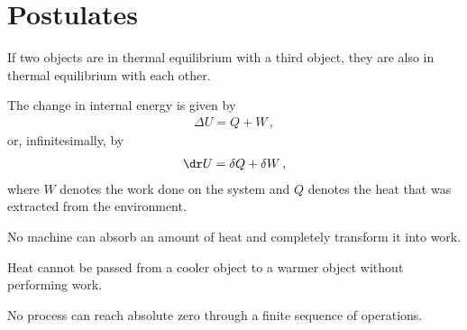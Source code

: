 \section{Postulates}

    \begin{axiom}
        If two objects are in thermal equilibrium with a third object, they are also in thermal equilibrium with each other.
    \end{axiom}
    \begin{axiom}
        The change in internal energy is given by
        \begin{gather}
            \label{thermo:first_law}
            \Delta U = Q + W\,,
        \end{gather}
        or, infinitesimally, by
        \begin{gather}
            \label{thermo:first_law_differential}
            \dr U = \delta Q + \delta W\,,
        \end{gather}
        where $W$ denotes the work done on the system and $Q$ denotes the heat that was extracted from the environment.
    \end{axiom}

    \begin{axiom}
        No machine can absorb an amount of heat and completely transform it into work.
    \end{axiom}
    \begin{axiom}
        Heat cannot be passed from a cooler object to a warmer object without performing work.
    \end{axiom}


    \begin{axiom}
        No process can reach absolute zero through a finite sequence of operations.
    \end{axiom}

